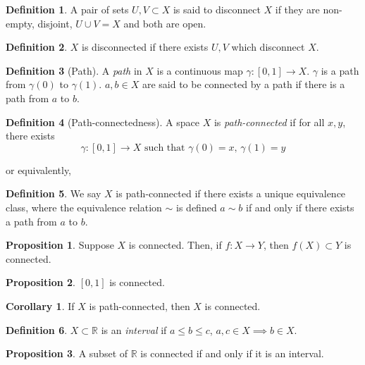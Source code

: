 \documentclass[a4paper,14pt]{extarticle}
\theoremstyle{definition}
\newtheorem*{definition}{Definition}
\newtheorem*{corollary}{Corollary}
\newtheorem*{proposition}{Proposition}
\begin{document}
\begin{definition}
  A pair of sets $U,V\subset X$ is said to disconnect $X$ if they are non-empty, disjoint,
  $U\cup V=X$ and both are open.
\end{definition}

\begin{definition}
  $X$ is disconnected if there exists $U,V$ which disconnect $X$.
\end{definition}


\begin{definition}[Path]
  A \emph{path} in $X$ is a continuous map $\gamma:[0,1]\rightarrow X$. $\gamma$ is a path 
  from $\gamma(0)$ to $\gamma(1)$. $a,b\in X$ are said to be connected by a path if there 
  is a path from $a$ to $b$.
\end{definition}

\begin{definition}[Path-connectedness]
  A space $X$ is \emph{path-connected} if for all $x,y$, there exists
  \[\gamma:[0,1]\rightarrow X\text{ such that }\gamma(0)=x, \,\gamma(1)=y\]
\end{definition}

\noindent or equivalently,

\begin{definition}
  We say $X$ is path-connected if there exists a unique equivalence class, where the 
  equivalence relation $\sim$ is defined $a\sim b$ if and only if there exists a path from 
  $a$ to $b$.
\end{definition}

\begin{proposition}
  Suppose $X$ is connected. Then, if $f:X\rightarrow Y$, then $f(X)\subset Y$ is connected.
\end{proposition}

\begin{proposition}
  $[0,1]$ is connected.
\end{proposition}

\begin{corollary}
  If $X$ is path-connected, then $X$ is connected.
\end{corollary}

\begin{definition} $X\subset\mathbb{R}$ is an \emph{interval} if $a\leq b\leq c$, 
  $a,c\in X\implies b\in X$. 
\end{definition}

\begin{proposition}
  A subset of $\mathbb{R}$ is connected if and only if it is an interval.
\end{proposition}
\end{document}
